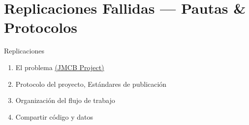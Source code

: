 \documentclass{beamer}
\begin{document}
{ %
    \begin{frame}[plain]
     \end{frame}
}
\section{Replicaciones Fallidas --- Pautas \& Protocolos}
\begin{frame}{Replicaciones}
\begin{enumerate}[<.->]
 \item El problema	\href{http://www.jstor.org/stable/1806061}{(JMCB Project)}
 \item Protocolo del proyecto, Estándares de publicación
 \item Organización del flujo de trabajo
 \item Compartir código y datos
\end{enumerate}
\end{frame}

 { %
    \begin{frame}[plain, label=AEAreg]
     \end{frame}
}
\end{document}
